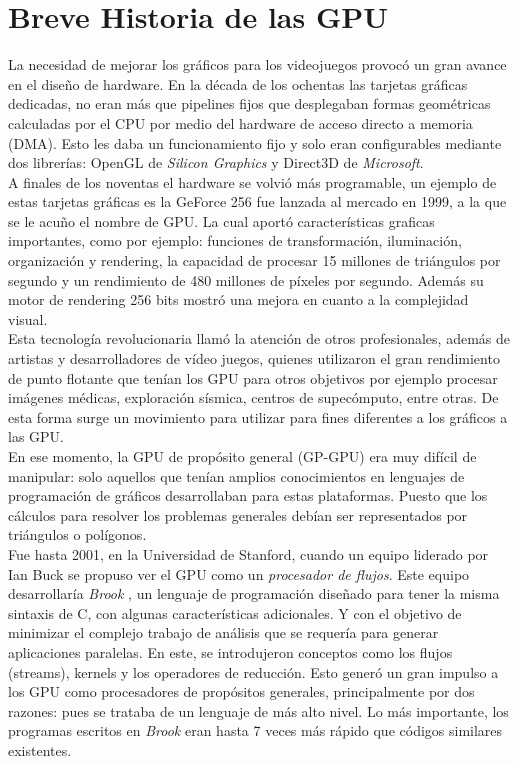 \section{Breve Historia de las GPU}
La necesidad de mejorar los gráficos para los videojuegos provocó un gran avance en el diseño de hardware. En la década de los ochentas las tarjetas gráficas dedicadas, no eran más que pipelines fijos que desplegaban formas geométricas calculadas por el CPU por medio del hardware de acceso directo a memoria (DMA). Esto les daba un funcionamiento fijo y solo eran configurables mediante dos librerías: OpenGL de \textit{Silicon Graphics} y Direct3D de \textit{Microsoft}.\\
A finales de los noventas el hardware se volvió más programable, un ejemplo de estas tarjetas gráficas es la GeForce 256\cite{GeForce256} fue lanzada al mercado en 1999, a la que se le acuño el nombre de GPU. La cual aportó características graficas importantes, como por ejemplo: funciones de  transformación, iluminación, organización y rendering, la capacidad de procesar 15 millones de triángulos por segundo y un rendimiento de 480 millones de píxeles por segundo. Además su motor de rendering  256 bits mostró una mejora en cuanto a la complejidad visual.\\
Esta tecnología revolucionaria llamó la atención de otros profesionales, además de artistas y desarrolladores de vídeo juegos, quienes utilizaron el gran rendimiento de punto flotante que tenían los GPU para otros objetivos por ejemplo procesar imágenes médicas, exploración sísmica, centros de supecómputo, entre otras\cite{aplicaciones}. De esta forma surge un movimiento para utilizar para fines diferentes a los gráficos a las GPU.\\
En ese momento, la GPU de propósito general (GP-GPU) era muy difícil de manipular: solo aquellos que tenían amplios conocimientos en lenguajes de programación de gráficos desarrollaban para estas plataformas. Puesto que los cálculos para resolver los problemas generales debían ser representados por triángulos o polígonos.\\
Fue hasta 2001, en la Universidad de Stanford, cuando un equipo liderado por Ian Buck se propuso ver el GPU como un  \textit{procesador de flujos}. Este equipo desarrollaría \textit{Brook} \cite{Buck2001}, un lenguaje de programación diseñado para tener la misma sintaxis de C, con algunas características adicionales. Y con el objetivo de minimizar el complejo trabajo de análisis que se requería para generar aplicaciones paralelas. En este, se introdujeron  conceptos como los flujos (streams), kernels y los operadores de reducción. Esto generó un gran impulso a los GPU como procesadores de propósitos generales, principalmente por dos razones: pues se trataba de un lenguaje de más alto nivel. Lo más importante, los programas escritos en \textit{Brook} eran hasta 7 veces más rápido que códigos similares existentes.\\
